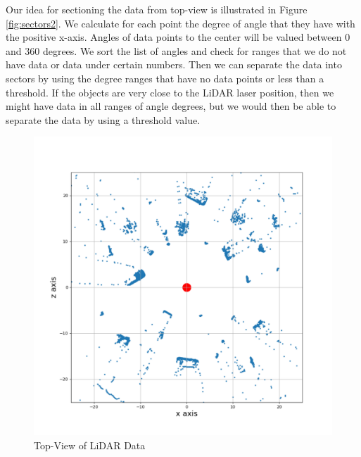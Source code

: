 Our idea for sectioning the data from top-view is illustrated in
Figure \ref{fig:sectors2}. We calculate for each point the degree of angle that they have with the 
positive
x-axis.
Angles of data points to the center will be valued between 0 and 360 degrees. We sort the list of angles
and check for ranges that we do not have data or data under certain numbers. 
Then we can separate the data into sectors by using the degree ranges that have no data points or less than a threshold. 
If the objects are very close to the LiDAR laser position, then we might have data in all ranges of angle degrees, but we would then be able
to separate the data by using a threshold value.
\begin{figure}[!h]
\centering
\begin{minipage}{0.40\textwidth}
  \centering
         \includegraphics[scale=0.3]{./images/sector-transforms/scene-with-centre.pdf}
       \caption{Top-View of LiDAR Data}
       \label{fig:sectors1}
\end{minipage}%
\begin{minipage}{0.40\textwidth}
  \centering

\end{minipage}
\end{figure}
